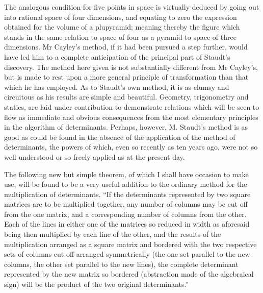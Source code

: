 \documentclass[11pt]{article}
\newcommand{\sourcepage}[1]{\marginpar{\scriptsize p.~#1}}
\begin{document}
{{\sourcepage{383}
The analogous condition for five points in space is virtually deduced by going out into rational space of four dimensions, and equating to zero the expression obtained for the volume of a plupyramid; meaning thereby the figure which stands in the same relation to space of four as a pyramid to space of three dimensions. Mr Cayley's method, if it had been pursued a step further, would have led him to a complete anticipation of the principal part of Staudt's discovery. The method here given is not substantially different from Mr Cayley's, but is made to rest upon a more general principle of transformation than that which he has employed. As to Staudt's own method, it is as clumsy and circuitous as his results are simple and beautiful. Geometry, trigonometry and statics, are laid under contribution to demonstrate relations which will be seen to flow as immediate and obvious consequences from the most elementary principles in the algorithm of determinants. Perhaps, however, M. Staudt's method is as good as could be found in the absence of the application of the method of determinants, the powers of which, even so recently as ten years ago, were not so well understood or so freely applied as at the present day.

The following new but simple theorem, of which I shall have occasion to make use, will be found to be a very useful addition to the ordinary method for the multiplication of determinants. ``If the determinants represented by two square matrices are to be multiplied together, any number of columns may be cut off from the one matrix, and a corresponding number of columns from the other. Each of the lines in either one of the matrices so reduced in width as aforesaid being then multiplied by each line of the other, and the results of the multiplication arranged as a square matrix and bordered with the two respective sets of columns cut off arranged symmetrically (the one set parallel to the new columns, the other set parallel to the new lines), the complete determinant represented by the new matrix so bordered (abstraction made of the algebraical sign) will be the product of the two original determinants.''

}}
\end{document}
